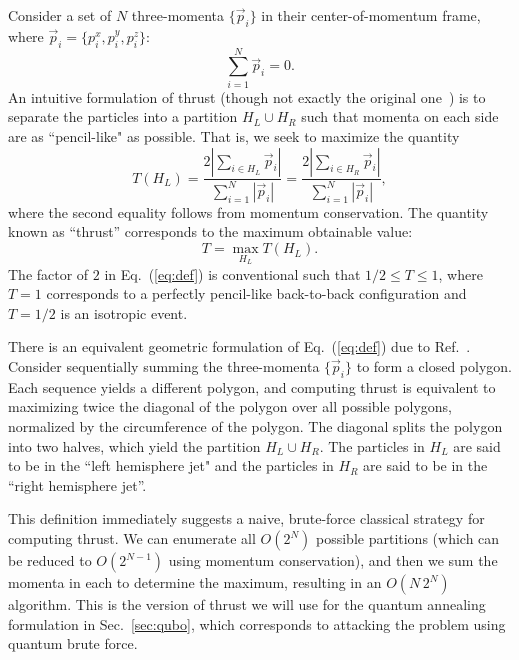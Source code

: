 \documentclass[aps,prd,twocolumn,superscriptaddress,preprintnumbers,nofootinbib,longbibliography,floatfix]{revtex4-1}
\DeclareRobustCommand{\Sec}[1]{Sec.~\ref{#1}}
\DeclareRobustCommand{\Eq}[1]{Eq.~(\ref{#1})}
\DeclareRobustCommand{\Ref}[1]{Ref.~\cite{#1}}
\begin{document}
Consider a set of $N$ three-momenta $\{\vec{p}_i\}$ in their center-of-momentum frame, where $\vec{p}_i =\{p^x_i, p^y_i, p^z_i\}$:
%
\begin{equation}
\sum_{i = 1}^N \vec{p}_i = 0.
\end{equation}
%
An intuitive formulation of thrust (though not exactly the original one~\cite{Brandt:1964sa,Farhi:1977sg}) is to separate the particles into a partition $H_L\cup H_R$ such that momenta on each side are as ``pencil-like" as possible.
%
That is, we seek to maximize the quantity
%
\begin{equation}
\label{eq:def}
T(H_L) = \frac{2 \left|\sum_{i\in H_L} \vec{p}_i\right|}{\sum_{i = 1}^N |\vec{p}_i|} = \frac{2 \left|\sum_{i\in H_R} \vec{p}_i\right|}{\sum_{i = 1}^N |\vec{p}_i|},
\end{equation}
%
where the second equality follows from momentum conservation.
%
The quantity known as ``thrust'' corresponds to the maximum obtainable value:
%
\begin{equation}
\label{eq:thrust_partition}
T = \max_{H_L} T(H_L).
\end{equation}
%
The factor of $2$ in \Eq{eq:def} is conventional such that $1/2 \leq T \leq 1$, where $T = 1$ corresponds to a perfectly pencil-like back-to-back configuration and $T = 1/2$ is an isotropic event.


There is an equivalent geometric formulation of \Eq{eq:def} due to \Ref{Brandt1979}.
%
Consider sequentially summing the three-momenta $\{\vec{p}_i\}$ to form a closed polygon.
%
Each sequence yields a different polygon, and computing thrust is equivalent to maximizing twice the diagonal of the polygon over all possible polygons, normalized by the circumference of the polygon.
%
The diagonal splits the polygon into two halves, which yield the partition $H_L\cup H_R$.
%
The particles in $H_L$ are said to be in the ``left hemisphere jet" and the particles in $H_R$ are said to be in the ``right hemisphere jet''.


This definition immediately suggests a naive, brute-force classical strategy for computing thrust.
%
We can enumerate all $O(2^N)$ possible partitions (which can be reduced to $O(2^{N-1})$ using momentum conservation), and then we sum the momenta in each to determine the maximum, resulting in an $O(N \, 2^N)$ algorithm.
%
This is the version of thrust we will use for the quantum annealing formulation in \Sec{sec:qubo}, which corresponds to attacking the problem using quantum brute force.
\end{document}
